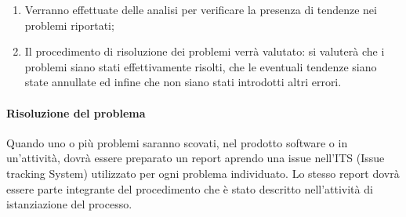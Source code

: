\begin{enumerate}
				\item Verranno effettuate delle analisi per verificare la presenza di tendenze nei problemi riportati;

				\item Il procedimento di risoluzione dei problemi verrà valutato: si valuterà che i problemi siano stati effettivamente risolti, che le eventuali tendenze siano state annullate ed infine che non siano stati introdotti altri errori.
			\end{enumerate}
		\paragraph{Risoluzione del problema}
			Quando uno o più problemi saranno scovati, nel prodotto software o in un'attività, dovrà essere preparato un report aprendo una issue nell'ITS (Issue tracking System) utilizzato per ogni problema individuato. Lo stesso report dovrà essere parte integrante del procedimento che è stato descritto nell'attività di istanziazione del processo.

